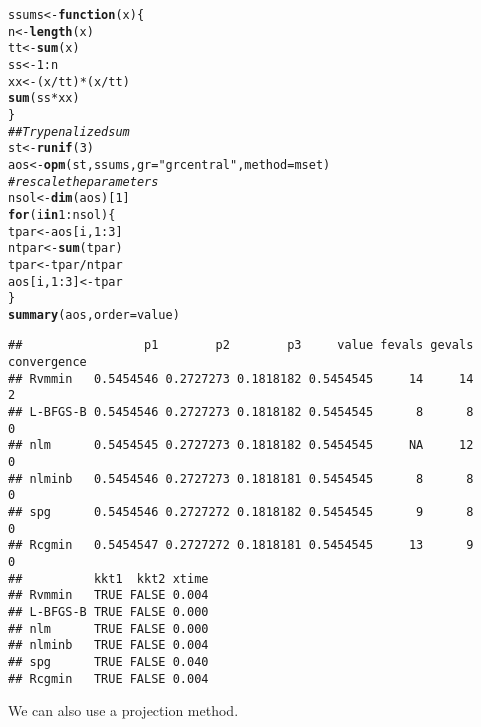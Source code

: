 \documentclass[11pt]{article}\usepackage[]{graphicx}\usepackage[]{color}
\makeatletter
\newcommand{\hlnum}[1]{\textcolor[rgb]{0.686,0.059,0.569}{#1}}%
\newcommand{\hlstr}[1]{\textcolor[rgb]{0.192,0.494,0.8}{#1}}%
\newcommand{\hlcom}[1]{\textcolor[rgb]{0.678,0.584,0.686}{\textit{#1}}}%
\newcommand{\hlopt}[1]{\textcolor[rgb]{0,0,0}{#1}}%
\newcommand{\hlstd}[1]{\textcolor[rgb]{0.345,0.345,0.345}{#1}}%
\newcommand{\hlkwa}[1]{\textcolor[rgb]{0.161,0.373,0.58}{\textbf{#1}}}%
\newcommand{\hlkwb}[1]{\textcolor[rgb]{0.69,0.353,0.396}{#1}}%
\newcommand{\hlkwc}[1]{\textcolor[rgb]{0.333,0.667,0.333}{#1}}%
\newcommand{\hlkwd}[1]{\textcolor[rgb]{0.737,0.353,0.396}{\textbf{#1}}}%
\newenvironment{kframe}{%
 \def\at@end@of@kframe{}%
 \ifinner\ifhmode%
  \def\at@end@of@kframe{\end{minipage}}%
  \begin{minipage}{\columnwidth}%
 \fi\fi%
 \def\FrameCommand##1{\hskip\@totalleftmargin \hskip-\fboxsep
 \colorbox{shadecolor}{##1}\hskip-\fboxsep
     \hskip-\linewidth \hskip-\@totalleftmargin \hskip\columnwidth}%
 \MakeFramed {\advance\hsize-\width
   \@totalleftmargin\z@ \linewidth\hsize
   \@setminipage}}%
 {\par\unskip\endMakeFramed%
 \at@end@of@kframe}
\newenvironment{knitrout}{}{} %
\makeatother
\begin{document}
\begin{knitrout}\scriptsize
{}\color{fgcolor}\begin{kframe}
\begin{alltt}
\hlstd{ssums}\hlkwb{<-}\hlkwa{function}\hlstd{(}\hlkwc{x}\hlstd{)\{}
  \hlstd{n}\hlkwb{<-}\hlkwd{length}\hlstd{(x)}
  \hlstd{tt}\hlkwb{<-}\hlkwd{sum}\hlstd{(x)}
  \hlstd{ss}\hlkwb{<-}\hlnum{1}\hlopt{:}\hlstd{n}
  \hlstd{xx}\hlkwb{<-}\hlstd{(x}\hlopt{/}\hlstd{tt)}\hlopt{*}\hlstd{(x}\hlopt{/}\hlstd{tt)}
  \hlkwd{sum}\hlstd{(ss}\hlopt{*}\hlstd{xx)}
\hlstd{\}}
\hlcom{## Try penalized sum}
\hlstd{st}\hlkwb{<-}\hlkwd{runif}\hlstd{(}\hlnum{3}\hlstd{)}
\hlstd{aos}\hlkwb{<-}\hlkwd{opm}\hlstd{(st, ssums,} \hlkwc{gr}\hlstd{=}\hlstr{"grcentral"}\hlstd{,} \hlkwc{method}\hlstd{=mset)}
\hlcom{# rescale the parameters}
\hlstd{nsol}\hlkwb{<-}\hlkwd{dim}\hlstd{(aos)[}\hlnum{1}\hlstd{]}
\hlkwa{for} \hlstd{(i} \hlkwa{in} \hlnum{1}\hlopt{:}\hlstd{nsol)\{}
  \hlstd{tpar}\hlkwb{<-}\hlstd{aos[i,}\hlnum{1}\hlopt{:}\hlnum{3}\hlstd{]}
  \hlstd{ntpar}\hlkwb{<-}\hlkwd{sum}\hlstd{(tpar)}
  \hlstd{tpar}\hlkwb{<-}\hlstd{tpar}\hlopt{/}\hlstd{ntpar}
  \hlstd{aos[i,} \hlnum{1}\hlopt{:}\hlnum{3}\hlstd{]}\hlkwb{<-}\hlstd{tpar}
\hlstd{\}}
\hlkwd{summary}\hlstd{(aos,}\hlkwc{order}\hlstd{=value)}
\end{alltt}
\begin{verbatim}
##                 p1        p2        p3     value fevals gevals convergence
## Rvmmin   0.5454546 0.2727273 0.1818182 0.5454545     14     14           2
## L-BFGS-B 0.5454546 0.2727273 0.1818182 0.5454545      8      8           0
## nlm      0.5454545 0.2727273 0.1818182 0.5454545     NA     12           0
## nlminb   0.5454546 0.2727273 0.1818181 0.5454545      8      8           0
## spg      0.5454546 0.2727272 0.1818182 0.5454545      9      8           0
## Rcgmin   0.5454547 0.2727272 0.1818181 0.5454545     13      9           0
##          kkt1  kkt2 xtime
## Rvmmin   TRUE FALSE 0.004
## L-BFGS-B TRUE FALSE 0.000
## nlm      TRUE FALSE 0.000
## nlminb   TRUE FALSE 0.004
## spg      TRUE FALSE 0.040
## Rcgmin   TRUE FALSE 0.004
\end{verbatim}
\end{kframe}
\end{knitrout}

We can also use a projection method.
\end{document}
